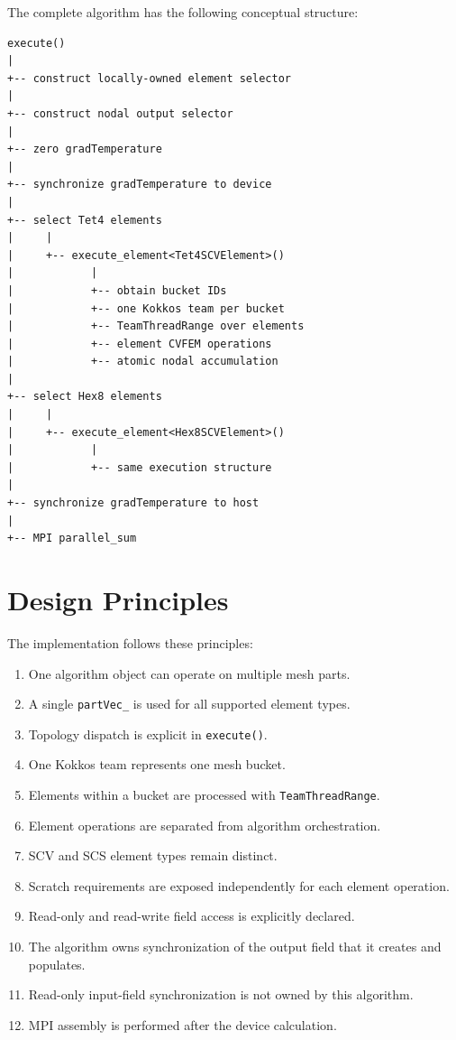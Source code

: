 \documentclass[11pt]{article}
\begin{document}
The complete algorithm has the following conceptual structure:

\begin{verbatim}
execute()
|
+-- construct locally-owned element selector
|
+-- construct nodal output selector
|
+-- zero gradTemperature
|
+-- synchronize gradTemperature to device
|
+-- select Tet4 elements
|     |
|     +-- execute_element<Tet4SCVElement>()
|            |
|            +-- obtain bucket IDs
|            +-- one Kokkos team per bucket
|            +-- TeamThreadRange over elements
|            +-- element CVFEM operations
|            +-- atomic nodal accumulation
|
+-- select Hex8 elements
|     |
|     +-- execute_element<Hex8SCVElement>()
|            |
|            +-- same execution structure
|
+-- synchronize gradTemperature to host
|
+-- MPI parallel_sum
\end{verbatim}

\section{Design Principles}

The implementation follows these principles:

\begin{enumerate}
\item One algorithm object can operate on multiple mesh parts.
\item A single \texttt{partVec\_} is used for all supported
element types.
\item Topology dispatch is explicit in \texttt{execute()}.
\item One Kokkos team represents one mesh bucket.
\item Elements within a bucket are processed with
\texttt{TeamThreadRange}.
\item Element operations are separated from algorithm orchestration.
\item SCV and SCS element types remain distinct.
\item Scratch requirements are exposed independently for each
element operation.
\item Read-only and read-write field access is explicitly declared.
\item The algorithm owns synchronization of the output field that
it creates and populates.
\item Read-only input-field synchronization is not owned by this
algorithm.
\item MPI assembly is performed after the device calculation.
\end{enumerate}
\end{document}
